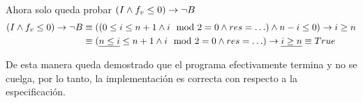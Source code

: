 \begin{enumerate}[label=\alph*)]
          Ahora solo queda probar $(I \land f_v \leq 0) \rightarrow \neg B$
          \begin{align*}
              (I \land f_v \leq 0) \rightarrow \neg B & \equiv ((0 \leq i \leq n + 1 \land i \mod 2 = 0 \land res = \ldots) \land n - i \leq 0) \rightarrow i \geq n                \\
                                                & \equiv (\underline{n \leq i} \leq n + 1 \land i \mod 2 = 0 \land res = \ldots) \rightarrow \underline{i \geq n} \equiv True
          \end{align*}

          De esta manera queda demostrado que el programa efectivamente termina y no se cuelga, por lo tanto, la implementación es correcta con respecto a la especificación.
\end{enumerate}


